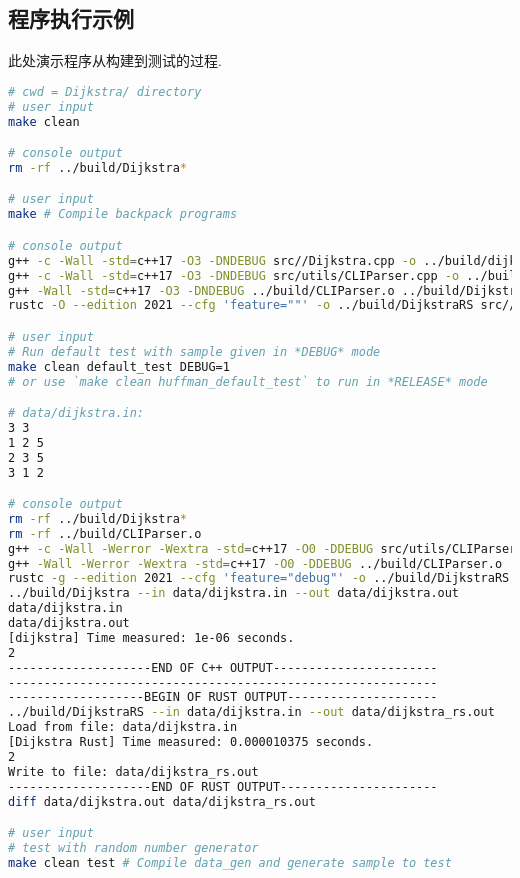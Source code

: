 \subsection{程序执行示例}
\label{sec:dpBench}
此处演示程序从构建到测试的过程.
\begin{lstlisting}[language=bash]
# cwd = Dijkstra/ directory
# user input
make clean

# console output
rm -rf ../build/Dijkstra*

# user input
make # Compile backpack programs

# console output
g++ -c -Wall -std=c++17 -O3 -DNDEBUG src//Dijkstra.cpp -o ../build/dijkstra.o
g++ -c -Wall -std=c++17 -O3 -DNDEBUG src/utils/CLIParser.cpp -o ../build/CLIParser.o
g++ -Wall -std=c++17 -O3 -DNDEBUG ../build/CLIParser.o ../build/Dijkstra.o -o ../build/Dijkstra
rustc -O --edition 2021 --cfg 'feature=""' -o ../build/DijkstraRS src//main.rs

# user input
# Run default test with sample given in *DEBUG* mode
make clean default_test DEBUG=1
# or use `make clean huffman_default_test` to run in *RELEASE* mode

# data/dijkstra.in:
3 3
1 2 5
2 3 5
3 1 2

# console output
rm -rf ../build/Dijkstra*
rm -rf ../build/CLIParser.o
g++ -c -Wall -Werror -Wextra -std=c++17 -O0 -DDEBUG src/utils/CLIParser.cpp -o ../build/CLIParser.o
g++ -Wall -Werror -Wextra -std=c++17 -O0 -DDEBUG ../build/CLIParser.o ../build/Dijkstra.o -o ../build/Dijkstra
rustc -g --edition 2021 --cfg 'feature="debug"' -o ../build/DijkstraRS src//main.rs
../build/Dijkstra --in data/dijkstra.in --out data/dijkstra.out
data/dijkstra.in
data/dijkstra.out
[dijkstra] Time measured: 1e-06 seconds.
2
--------------------END OF C++ OUTPUT-----------------------
------------------------------------------------------------
-------------------BEGIN OF RUST OUTPUT---------------------
../build/DijkstraRS --in data/dijkstra.in --out data/dijkstra_rs.out
Load from file: data/dijkstra.in
[Dijkstra Rust] Time measured: 0.000010375 seconds.
2
Write to file: data/dijkstra_rs.out
--------------------END OF RUST OUTPUT----------------------
diff data/dijkstra.out data/dijkstra_rs.out

# user input
# test with random number generator
make clean test # Compile data_gen and generate sample to test


\end{lstlisting}
